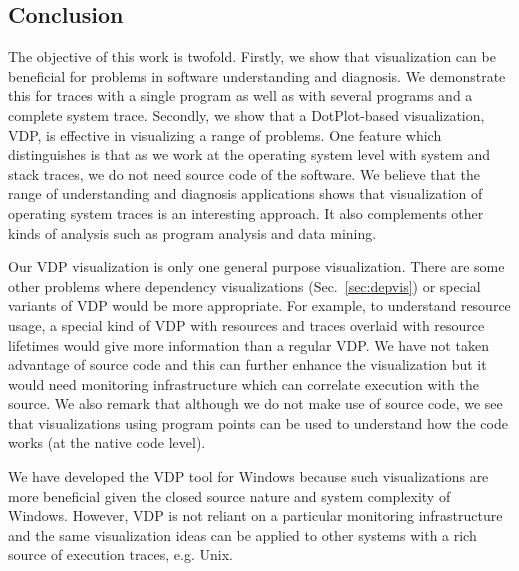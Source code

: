 \subsection{Conclusion}
\label{sec:conclusion}

The objective of this work is twofold.
Firstly, we show that visualization can be beneficial for problems
in software understanding and diagnosis. We demonstrate this
for traces with a single program as well as with
several programs and a complete system trace.
Secondly, we show that a DotPlot-based visualization, VDP, is effective
in visualizing a range of problems.
One feature which distinguishes  is that as we work
at the operating system level with system and stack traces,
we do not need source code of the software.
We believe that the range of understanding and diagnosis applications
shows that visualization of operating system traces is an interesting approach.
It also complements other kinds of analysis such
as program analysis and data mining.

Our VDP visualization is only one general purpose visualization.
There are some other problems where dependency visualizations
(Sec.~\ref{sec:depvis}) or special
variants of VDP would be more appropriate. For example, to understand
resource usage, a special kind of VDP with resources and traces overlaid
with resource lifetimes would give more information than a regular VDP.
We have not taken advantage of source code and this can further enhance
the visualization but it would need monitoring infrastructure which
can correlate execution with the source.
We also remark that although we do not make use of source code, we
see that visualizations using program points can be used to understand
how the code works (at the native code level).

We have developed the VDP tool for Windows because such visualizations
are more beneficial given the closed source nature and system complexity
of Windows.
However, VDP is not reliant on a particular monitoring
infrastructure and the same visualization ideas can be applied
to other systems with a rich source of execution traces, e.g. Unix.
